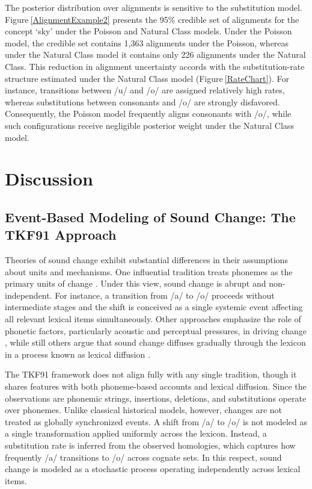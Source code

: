 \documentclass[numsec,webpdf,modern,large,namedate]{oup-authoring-template}
\begin{document}
The posterior distribution over alignments is sensitive to the substitution model. Figure$~$\ref{AlignmentExample2} presents the 95\% credible set of alignments for the concept ‘sky’ under the Poisson and Natural Class models. Under the Poisson model, the credible set contains 1,363 alignments under the Poisson, whereas under the Natural Class model it contains only 226 alignments under the Natural Class. This reduction in alignment uncertainty accords with the substitution-rate structure estimated under the Natural Class model (Figure$~$\ref{RateChart}). For instance, transitions between /u/ and /o/ are assigned relatively high rates, whereas substitutions between consonants and /o/ are strongly disfavored. Consequently, the Poisson model frequently aligns consonants with /o/, while such configurations receive negligible posterior weight under the Natural Class model. 

\section{Discussion}
\label{PaperSections_DiscussionSection}
\subsection{Event-Based Modeling of Sound Change: The TKF91 Approach}
\label{PaperSections_OtherApproaches}
Theories of sound change exhibit substantial differences in their assumptions about units and mechanisms. One influential tradition treats phonemes as the primary units of change \citep{Bloomfield1933}. Under this view, sound change is abrupt and non-independent. For instance, a transition from /a/ to /o/ proceeds without intermediate stages and the shift is conceived as a single systemic event affecting all relevant lexical items simultaneously. Other approaches emphasize the role of phonetic factors, particularly acoustic and perceptual pressures, in driving change \citep{Ohala2003,Blevins2004a,Ohala2012}, while still others argue that sound change diffuses gradually through the lexicon in a process known as lexical diffusion \citep{Chen1975a,Phillips2015}. 

The TKF91 framework does not align fully with any single tradition, though it shares features with both phoneme-based accounts and lexical diffusion. Since the observations are phonemic strings, insertions, deletions, and substitutions operate over phonemes. Unlike classical historical models, however, changes are not treated as globally synchronized events. A shift from /a/ to /o/ is not modeled as a single transformation applied uniformly across the lexicon. Instead, a substitution rate is inferred from the observed homologies, which captures how frequently /a/ transitions to /o/ across cognate sets. In this respect, sound change is modeled as a stochastic process operating independently across lexical items. 
\end{document}
